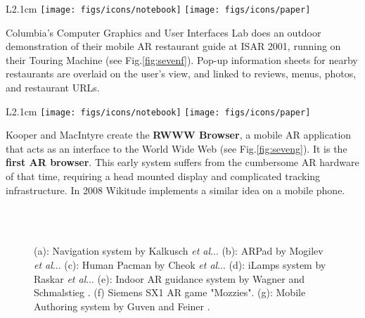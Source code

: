 \documentclass[12pt,a4paper]{article}
\makeatletter
\DeclareRobustCommand\onedot{\futurelet\@let@token\@onedot}
\def\@onedot{\ifx\@let@token.\else.\null\fi\xspace}
\def\etal{\emph{et al}\onedot}
\makeatother
\begin{document}
\vspace{0.1in}

\begin{wrapfigure}{L}{2.1cm}
	\vspace{-10pt}	
	\texttt{[image: figs/icons/notebook]}
	\texttt{[image: figs/icons/paper]}	
	\vspace{-20pt}		
\end{wrapfigure}
\noindent Columbia's Computer Graphics and User Interfaces Lab does an outdoor demonstration of their mobile AR restaurant guide at ISAR 2001, running on their Touring Machine \cite{Bell01} (see Fig.\ref{fig:sevenf}). Pop-up information sheets for nearby restaurants are overlaid on the user's view, and linked to reviews, menus, photos, and restaurant URLs.

\vspace{0.1in}

\begin{wrapfigure}{L}{2.1cm}
	\vspace{-10pt}	
	\texttt{[image: figs/icons/notebook]}
	\texttt{[image: figs/icons/paper]}	
	\vspace{-20pt}		
\end{wrapfigure}
\noindent Kooper and MacIntyre create the \textbf{RWWW Browser}, a mobile AR application that acts as an interface to the World Wide Web \cite{Kooper03} (see Fig.\ref{fig:seveng}). It is the \textbf{first AR browser}. This early system suffers from the cumbersome AR hardware of that time, requiring a head mounted display and complicated tracking infrastructure. In 2008 Wikitude implements a similar idea on a mobile phone.

 \begin{figure}[tbp]
\centering
\vspace{-20pt}
 \hfill
{} \\
 \hfill
{} \\
 \hfill
{} \hfill
{}
\vspace{-10pt}
\caption{(a): Navigation system by Kalkusch \etal \cite{Kalkusch02}. 
(b): ARPad by Mogilev \etal \cite{Mogilev02}. (c): Human Pacman by Cheok \etal \cite{Cheok03}. (d): iLamps system by Raskar \etal \cite{Raskar03}. (e): Indoor AR guidance system by Wagner and Schmalstieg \cite{Wagner03}. (f) Siemens SX1 AR game "Mozzies". (g): Mobile Authoring system by Guven and Feiner \cite{Guven03}.} \label{fig:eight}
\vspace{-0pt}
\end{figure}
\end{document}
